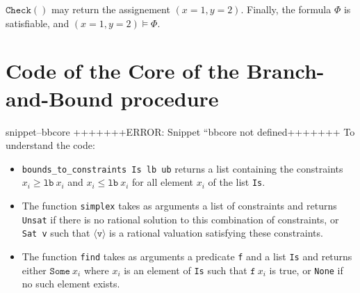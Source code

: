 \documentclass{article}
\newcommand{\icheck}{\mathtt{Check}()}
\newcommand{\Snippet}[1]{%
  \ifcsname snippet--#1\endcsname{\csname snippet--#1\endcsname}%
  \else+++++++ERROR: Snippet ``#1 not defined+++++++ \fi}
\begin{document}
$\icheck$ may return the assignement $(x=1, y=2)$. Finally, the formula $\Phi$
is satisfiable, and $(x=1, y=2) \vDash \Phi$.

\section{Code of the Core of the Branch-and-Bound procedure}
\label{bbcode}

\Snippet{bbcore}
To understand the code:
\begin{itemize}
  \item \texttt{bounds\_to\_constraints Is lb ub} returns a list containing the
    constraints $x_i \geqslant \mathtt{lb}~x_i$ and
    $x_i \leqslant \mathtt{lb}~x_i$ for all element $x_i$ of the list
    \texttt{Is}.
  \item The function \texttt{simplex} takes as arguments a list of
    constraints and returns \texttt{Unsat} if there is no rational solution to
    this combination of constraints, or \texttt{Sat v} such that
    $\langle \mathtt{v} \rangle$ is a rational valuation satisfying these
    constraints.
  \item The function \texttt{find} takes as arguments a predicate \texttt{f}
    and a list \texttt{Is} and returns either $\mathtt{Some}~x_i$ where $x_i$ is
    an element of \texttt{Is} such that $\mathtt{f}~x_i$ is true, or
    \texttt{None} if no such element exists.
\end{itemize}
\end{document}
